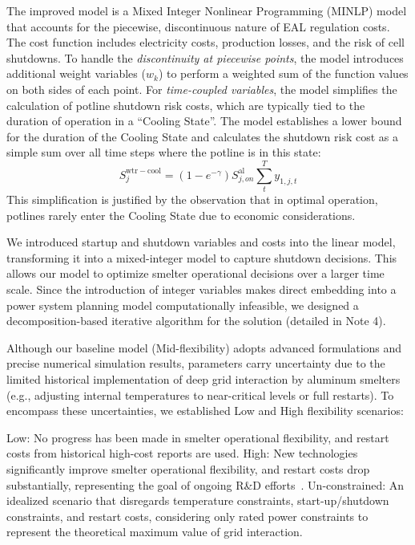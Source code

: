 \documentclass[preprint,12pt]{elsarticle}
\begin{document}
The improved model is a Mixed Integer Nonlinear Programming (MINLP) model that accounts for the piecewise, discontinuous nature of EAL regulation costs. The cost function includes electricity costs, production losses, and the risk of cell shutdowns. To handle the \textit{discontinuity at piecewise points}, the model introduces additional weight variables ($w_k$) to perform a weighted sum of the function values on both sides of each point. For \textit{time-coupled variables}, the model simplifies the calculation of potline shutdown risk costs, which are typically tied to the duration of operation in a ``Cooling State''. The model establishes a lower bound for the duration of the Cooling State and calculates the shutdown risk cost as a simple sum over all time steps where the potline is in this state:
\begin{equation}
S_j^\mathrm{wtr-cool} = (1-e^{-\gamma}) S_{j,on}^\mathrm{al} \sum_t^T y_{1,j,t}
\end{equation}
This simplification is justified by the observation that in optimal operation, potlines rarely enter the Cooling State due to economic considerations.

We introduced startup and shutdown variables and costs into the linear model, transforming it into a mixed-integer model to capture shutdown decisions. This allows our model to optimize smelter operational decisions over a larger time scale. Since the introduction of integer variables makes direct embedding into a power system planning model computationally infeasible, we designed a decomposition-based iterative algorithm for the solution (detailed in Note 4).

Although our baseline model (Mid-flexibility) adopts advanced formulations and precise numerical simulation results, parameters carry uncertainty due to the limited historical implementation of deep grid interaction by aluminum smelters (e.g., adjusting internal temperatures to near-critical levels or full restarts). To encompass these uncertainties, we established Low and High flexibility scenarios:

Low: No progress has been made in smelter operational flexibility, and restart costs from historical high-cost reports are used.
High: New technologies significantly improve smelter operational flexibility, and restart costs drop substantially, representing the goal of ongoing R\&D efforts~\citep{lukin_reduction_2016}.
Un-constrained: An idealized scenario that disregards temperature constraints, start-up/shutdown constraints, and restart costs, considering only rated power constraints to represent the theoretical maximum value of grid interaction.
\end{document}
